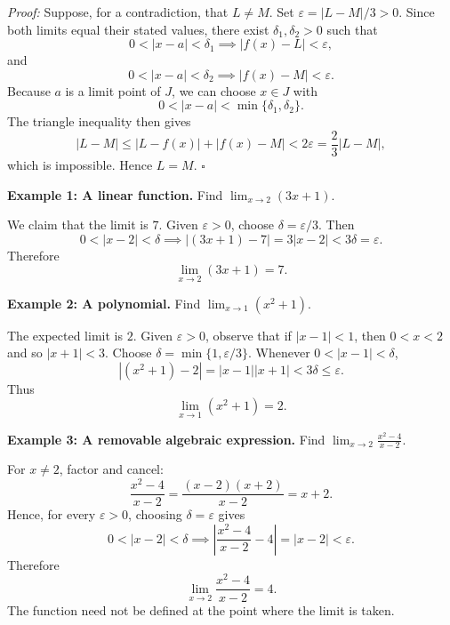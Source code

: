 \documentclass[a4paper,11pt,abstracton]{scrartcl}
\theoremstyle{dotlessP}
\theoremstyle{dotlessS}
\theoremstyle{remark}
\theoremstyle{definition}
\begin{document}
\begin{claim_box}
\textit{Proof:}
Suppose, for a contradiction, that $L\ne M$. Set $\varepsilon=|L-M|/3>0$. Since both limits equal their stated values, there exist $\delta_1,\delta_2>0$ such that
\[
0<|x-a|<\delta_1\implies |f(x)-L|<\varepsilon,
\]
and
\[
0<|x-a|<\delta_2\implies |f(x)-M|<\varepsilon.
\]
Because $a$ is a limit point of $J$, we can choose $x\in J$ with
\[
0<|x-a|<\min\{\delta_1,\delta_2\}.
\]
The triangle inequality then gives
\[
|L-M|\le |L-f(x)|+|f(x)-M|<2\varepsilon
=\frac{2}{3}|L-M|,
\]
which is impossible. Hence $L=M$.
\hfill$\square$
\end{claim_box}

\begin{example_box}
\textbf{Example 1: A linear function.} Find $\displaystyle\lim_{x\to 2}(3x+1)$.
\end{example_box}
\begin{example_claim_box}
We claim that the limit is $7$. Given $\varepsilon>0$, choose $\delta=\varepsilon/3$. Then
\[
0<|x-2|<\delta\implies |(3x+1)-7|=3|x-2|<3\delta=\varepsilon.
\]
Therefore
\[
\boxed{\lim_{x\to2}(3x+1)=7.}
\]
\end{example_claim_box}

\begin{example_box}
\textbf{Example 2: A polynomial.} Find $\displaystyle\lim_{x\to 1}(x^2+1)$.
\end{example_box}
\begin{example_claim_box}
The expected limit is $2$. Given $\varepsilon>0$, observe that if $|x-1|<1$, then $0<x<2$ and so $|x+1|<3$. Choose $\delta=\min\{1,\varepsilon/3\}$. Whenever $0<|x-1|<\delta$,
\[
|(x^2+1)-2|=|x-1||x+1|<3\delta\le\varepsilon.
\]
Thus
\[
\boxed{\lim_{x\to1}(x^2+1)=2.}
\]
\end{example_claim_box}

\begin{example_box}
\textbf{Example 3: A removable algebraic expression.} Find $\displaystyle\lim_{x\to2}\frac{x^2-4}{x-2}$.
\end{example_box}
\begin{example_claim_box}
For $x\ne2$, factor and cancel:
\[
\frac{x^2-4}{x-2}=\frac{(x-2)(x+2)}{x-2}=x+2.
\]
Hence, for every $\varepsilon>0$, choosing $\delta=\varepsilon$ gives
\[
0<|x-2|<\delta\implies
\left|\frac{x^2-4}{x-2}-4\right|=|x-2|<\varepsilon.
\]
Therefore
\[
\boxed{\lim_{x\to2}\frac{x^2-4}{x-2}=4.}
\]
The function need not be defined at the point where the limit is taken.
\end{example_claim_box}
\end{document}
